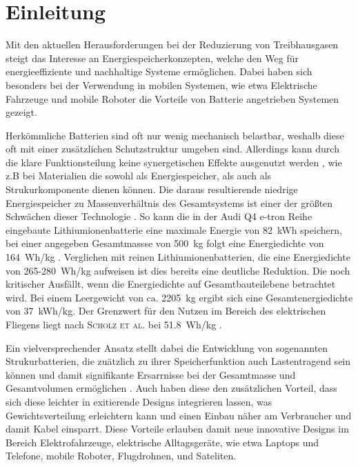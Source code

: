 \chapter[Einleitung]{\label{sec:Einleitung}Einleitung}
Mit den aktuellen Herausforderungen bei der Reduzierung von Treibhausgasen steigt das Interesse an Energiespeicherkonzepten, welche den Weg für energieeffiziente und nachhaltige Systeme ermöglichen. Dabei haben sich besonders bei der Verwendung in mobilen Systemen, wie etwa Elektrische Fahrzeuge \cite{Huo2015, Donateo2015,Jochem2015,Kim2014,Orsi2016,Silva2011,Holdway2010,Sternberg2015,Ramachandran2015} und mobile Roboter \cite{Hecht2023,Mikolajczyk2023,Ghobadpour2023,Wang2020} die Vorteile von Batterie angetrieben Systemen gezeigt.

Herkömmliche Batterien sind oft nur wenig mechanisch belastbar, weshalb diese oft mit einer zusätzlichen Schutzstruktur umgeben sind. Allerdings kann durch die klare Funktionsteilung keine synergetischen Effekte ausgenutzt werden , wie z.B bei Materialien die sowohl als Energiespeicher, als auch als Strukurkomponente dienen können. Die daraus resultierende niedrige Energiespeicher zu Massenverhältnis des Gesamtsystems ist einer der größten Schwächen dieser Technologie \cite{Armand2020,Schaefer2018, Cano2018,Goodenough2009}. 
So kann die in der Audi Q4 e-tron Reihe eingebaute Lithiumionenbatterie eine maximale Energie von 82~kWh speichern, bei einer angegeben Gesamtmassse von 500~kg folgt eine Energiedichte von 164~Wh/kg \cite{Radu2021,Audi2022}. Verglichen mit reinen Lithiumionenbatterien, die eine Energiedichte von 265-280~Wh/kg \cite{Armand2020} aufweisen ist dies bereits eine deutliche Reduktion. Die noch kritischer Ausfällt, wenn die Energiedichte auf Gesamtbauteilebene betrachtet wird. Bei einem Leergewicht von ca. 2205~kg \cite{Audi2022} ergibt sich eine Gesamtenergiedichte von 37~kWh/kg. Der Grenzwert für den Nutzen im Bereich des elektrischen Fliegens liegt nach \textsc{Scholz et al.} bei 51.8~Wh/kg \cite{Scholz2018}.

Ein vielversprechender Ansatz stellt dabei die Entwicklung von sogenannten Strukurbatterien, die zuätzlich zu ihrer Speicherfunktion auch Lastentragend sein können \cite{Johannisson2018, Danzi2021, Wetzel2004, Thomas2004, Liu2009, Ekstedt2010, Wang2019, Asp2019, Moyer2020, Zhao2020, Yin2020, Wang2020, Lutkenhaus2020, Fu2021, Jin2021, Kalnaus2021, Wong2007, Carlson2013, Xu2022} und damit signifikante Ersarrnisse bei der Gesamtmasse und Gesamtvolumen ermöglichen \cite{Wetzel2004, Snyder2015, Carlstedt2020a, Asp2014, Johannisson2019}. Auch haben diese den zusätzlichen Vorteil, dass sich diese leichter in exitierende Designs integrieren lassen, was Gewichtsverteilung erleichtern kann und einen Einbau näher am Verbraucher und damit Kabel einsparrt. Diese Vorteile erlauben damit neue innovative Designs im Bereich Elektrofahrzeuge, elektrische Alltagsgeräte, wie etwa Laptops und Telefone, mobile Roboter, Flugdrohnen, und Sateliten.


